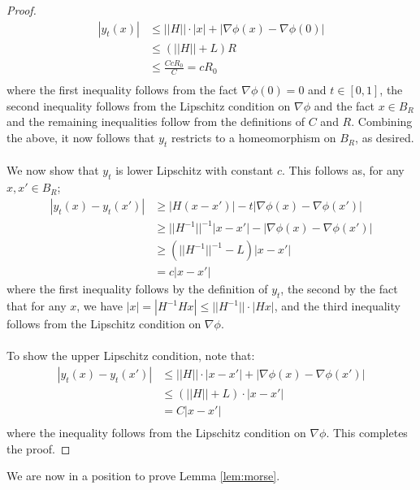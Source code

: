 \documentclass[11pt]{article}
\newcommand{\1}{\mathbf{1}}
\theoremstyle{definition}
\theoremstyle{remark}
\begin{document}
\begin{proof}
    \begin{equation}\nonumber
    \begin{split}
        |y_t(x)| & \leq ||H|| \cdot |x| + |\nabla \phi(x)-\nabla \phi(0)| \\
         & \leq (||H||+L)R \\
         & \leq \frac{CcR_0}{C}= cR_0\\
    \end{split}
    \end{equation}
    where the first inequality follows from the fact $\nabla \phi(0)=0$ and $t\in[0,1]$, the second inequality follows from the Lipschitz condition on $\nabla \phi$ and the fact $x \in B_R$ and the remaining inequalities follow from the definitions of $C$ and $R$. Combining the above, it now follows that $y_t$ restricts to a homeomorphism on $B_R$, as desired.\\
    \\
    We now show that $y_t$ is lower Lipschitz with constant $c$. This follows as, for any $x,x' \in B_R$;
    \begin{equation}
    \begin{split}
        |y_t(x)-y_t(x')| & \geq |H(x-x')| - t|\nabla \phi(x)-\nabla \phi(x')| \\
        & \geq  ||H^{-1}||^{-1}|x-x'| - |\nabla \phi(x)-\nabla \phi(x')| \\
        & \geq  (||H^{-1}||^{-1}-L)|x-x'| \\
        & = c|x-x'|
    \end{split}
    \end{equation}
    where the first inequality follows by the definition of $y_t$, the second by the fact that for any $x$, we have $|x| = |H^{-1}Hx| \leq ||H^{-1}||\cdot |Hx|$, and the third inequality follows from the Lipschitz condition on $\nabla \phi$.\\
    \\
    To show the upper Lipschitz condition, note that:
    \begin{equation}\nonumber
    \begin{split}
        |y_t(x)-y_t(x')| & \leq ||H|| \cdot |x-x'| + |\nabla \phi (x)-\nabla \phi (x')|\\
        & \leq (||H|| + L) \cdot |x-x'| \\
        & = C |x-x'| \\
    \end{split}
    \end{equation}
    where the inequality follows from the Lipschitz condition on $\nabla \phi$. This completes the proof.
\end{proof}
We are now in a position to prove Lemma \ref{lem:morse}.
\end{document}
